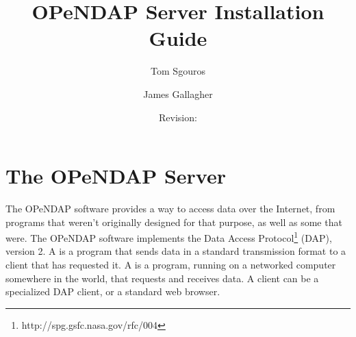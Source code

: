 \documentclass{dods-book}
\newcommand{\DOCdate}{\rcsInfoDate}
\begin{document}
\title{OPeNDAP Server Installation Guide\\\DOCdate}
\author{Tom Sgouros \and James Gallagher }
\date{Revision: \rcsInfoRevision}
\maketitle

\copyrightmatter

\W{}

%

\tableofcontents
\listoffigures
\listoftables

\clearemptydoublepage

%
%
%

%

\T\chapter{The OPeNDAP Server}

The OPeNDAP software provides a way to access data over the Internet,
from programs that weren't originally designed for that purpose, as
well as some that were. The OPeNDAP software implements the Data
Access Protocol\footnote{http://spg.gsfc.nasa.gov/rfc/004} (DAP),
version 2. A  is a program that sends data in a
standard transmission format to a client that has requested it. A
 is a program, running on a networked computer
somewhere in the world, that requests and receives data. A client can
be a specialized DAP client, or a standard web browser.
\end{document}
